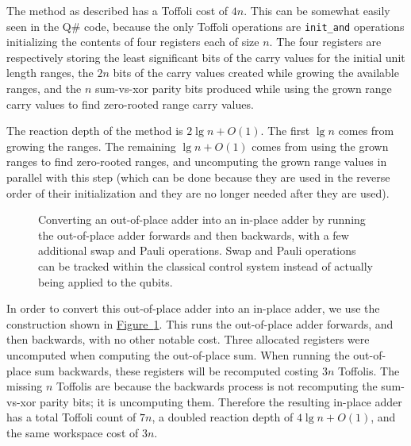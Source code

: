 \documentclass[onecolumn,unpublished]{quantumarticle}
\theoremstyle{definition}
\theoremstyle{definition}
\theoremstyle{definition}
\newcommand{\fig}[1]{\hyperref[fig:#1]{Figure~\ref*{fig:#1}}}
\begin{document}
The method as described has a Toffoli cost of $4n$.
This can be somewhat easily seen in the Q\# code, because the only Toffoli operations are \texttt{init\_and} operations initializing the contents of four registers each of size $n$.
The four registers are respectively storing the least significant bits of the carry values for the initial unit length ranges, the $2n$ bits of the carry values created while growing the available ranges, and the $n$ sum-vs-xor parity bits produced while using the grown range carry values to find zero-rooted range carry values.

The reaction depth of the method is $2 \lg n + O(1)$.
The first $\lg n$ comes from growing the ranges.
The remaining $\lg n + O(1)$ comes from using the grown ranges to find zero-rooted ranges, and uncomputing the grown range values in parallel with this step (which can be done because they are used in the reverse order of their initialization and they are no longer needed after they are used).

\begin{figure}
\centering
{}
    \caption{
        Converting an out-of-place adder into an in-place adder by running the out-of-place adder forwards and then backwards, with a few additional swap and Pauli operations.
        Swap and Pauli operations can be tracked within the classical control system instead of actually being applied to the qubits.
    }
    \label{fig:oop2ip}
\end{figure}

In order to convert this out-of-place adder into an in-place adder, we use the construction shown in \fig{oop2ip}.
This runs the out-of-place adder forwards, and then backwards, with no other notable cost.
Three allocated registers were uncomputed when computing the out-of-place sum.
When running the out-of-place sum backwards, these registers will be recomputed costing $3n$ Toffolis.
The missing $n$ Toffolis are because the backwards process is not recomputing the sum-vs-xor parity bits; it is uncomputing them.
Therefore the resulting in-place adder has a total Toffoli count of $7n$, a doubled reaction depth of $4 \lg n + O(1)$, and the same workspace cost of $3n$.
\end{document}
